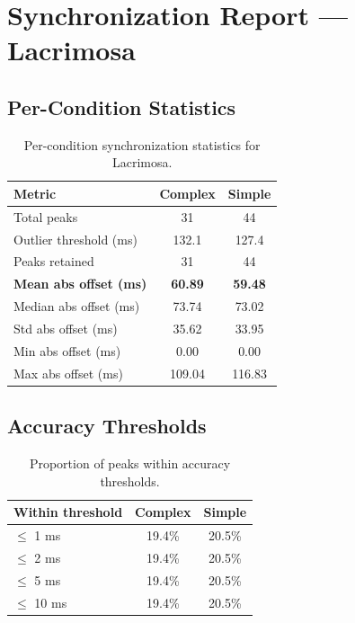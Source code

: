
\section*{Synchronization Report --- Lacrimosa}

\subsection*{Per-Condition Statistics}

\begin{table}[h!]
\centering
\begin{tabular}{|l|c|c|}
\hline
Metric & Complex & Simple \\
\hline
Total peaks & 31 & 44 \\
Outlier threshold (ms) & 132.1 & 127.4 \\
Peaks retained & 31 & 44 \\
\textbf{Mean abs offset (ms)} & \textbf{60.89} & \textbf{59.48} \\
Median abs offset (ms) & 73.74 & 73.02 \\
Std abs offset (ms) & 35.62 & 33.95 \\
Min abs offset (ms) & 0.00 & 0.00 \\
Max abs offset (ms) & 109.04 & 116.83 \\
\hline
\end{tabular}
\caption{Per-condition synchronization statistics for Lacrimosa.}
\label{tab:sync_stats}
\end{table}

\subsection*{Accuracy Thresholds}

\begin{table}[h!]
\centering
\begin{tabular}{|l|c|c|}
\hline
Within threshold & Complex & Simple \\
\hline
$\leq$ 1 ms & 19.4\% & 20.5\% \\
$\leq$ 2 ms & 19.4\% & 20.5\% \\
$\leq$ 5 ms & 19.4\% & 20.5\% \\
$\leq$ 10 ms & 19.4\% & 20.5\% \\
\hline
\end{tabular}
\caption{Proportion of peaks within accuracy thresholds.}
\label{tab:sync_accuracy}
\end{table}

